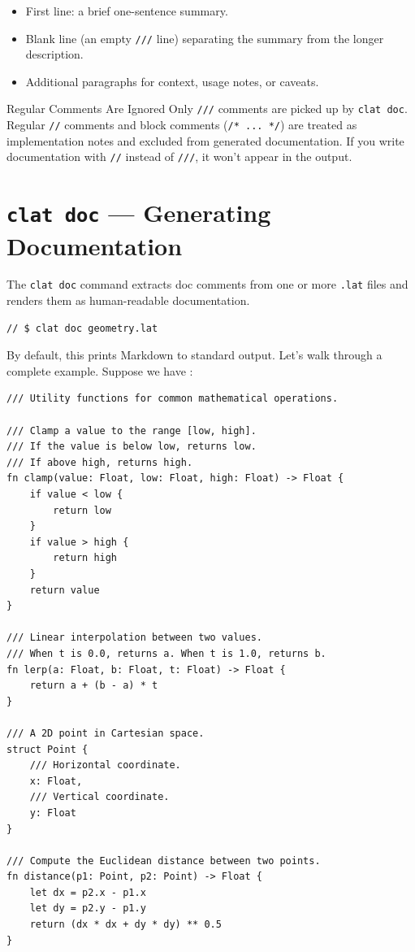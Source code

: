 \begin{itemize}
  \item First line: a brief one-sentence summary.
  \item Blank line (an empty \lstinline|///| line) separating the summary from the longer description.
  \item Additional paragraphs for context, usage notes, or caveats.
\end{itemize}

\begin{warnbox}{Regular Comments Are Ignored}
Only \lstinline|///| comments are picked up by \lstinline|clat doc|.
Regular \lstinline|//| comments and block comments (\lstinline|/* ... */|) are treated as implementation notes and excluded from generated documentation.
If you write documentation with \lstinline|//| instead of \lstinline|///|, it won't appear in the output.
\end{warnbox}

\section{\texttt{clat doc} --- Generating Documentation}\label{sec:clat-doc}

The \lstinline|clat doc| command extracts doc comments from one or more \lstinline|.lat| files and renders them as human-readable documentation.

\begin{lstlisting}[language=Lattice, caption={Basic usage of clat doc}]
// $ clat doc geometry.lat
\end{lstlisting}

By default, this prints Markdown to standard output.
Let's walk through a complete example.
Suppose we have :

\begin{lstlisting}[language=Lattice, caption={A well-documented utility module}]
/// Utility functions for common mathematical operations.

/// Clamp a value to the range [low, high].
/// If the value is below low, returns low.
/// If above high, returns high.
fn clamp(value: Float, low: Float, high: Float) -> Float {
    if value < low {
        return low
    }
    if value > high {
        return high
    }
    return value
}

/// Linear interpolation between two values.
/// When t is 0.0, returns a. When t is 1.0, returns b.
fn lerp(a: Float, b: Float, t: Float) -> Float {
    return a + (b - a) * t
}

/// A 2D point in Cartesian space.
struct Point {
    /// Horizontal coordinate.
    x: Float,
    /// Vertical coordinate.
    y: Float
}

/// Compute the Euclidean distance between two points.
fn distance(p1: Point, p2: Point) -> Float {
    let dx = p2.x - p1.x
    let dy = p2.y - p1.y
    return (dx * dx + dy * dy) ** 0.5
}
\end{lstlisting}


